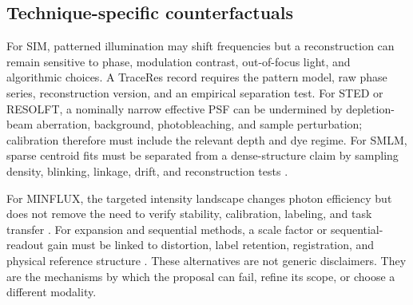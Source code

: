\documentclass[conference]{IEEEtran}
\begin{document}
\subsection{Technique-specific counterfactuals}

For SIM, patterned illumination may shift frequencies but a reconstruction can remain sensitive to phase, modulation contrast, out-of-focus light, and algorithmic choices. A TraceRes record requires the pattern model, raw phase series, reconstruction version, and an empirical separation test. For STED or RESOLFT, a nominally narrow effective PSF can be undermined by depletion-beam aberration, background, photobleaching, and sample perturbation; calibration therefore must include the relevant depth and dye regime. For SMLM, sparse centroid fits must be separated from a dense-structure claim by sampling density, blinking, linkage, drift, and reconstruction tests \cite{baddeley2018,lelek2021}.

For MINFLUX, the targeted intensity landscape changes photon efficiency but does not remove the need to verify stability, calibration, labeling, and task transfer \cite{balzarotti2017,schmidt2021}. For expansion and sequential methods, a scale factor or sequential-readout gain must be linked to distortion, label retention, registration, and physical reference structure \cite{reinhardt2023,zwettler2020}. These alternatives are not generic disclaimers. They are the mechanisms by which the proposal can fail, refine its scope, or choose a different modality.
\end{document}
